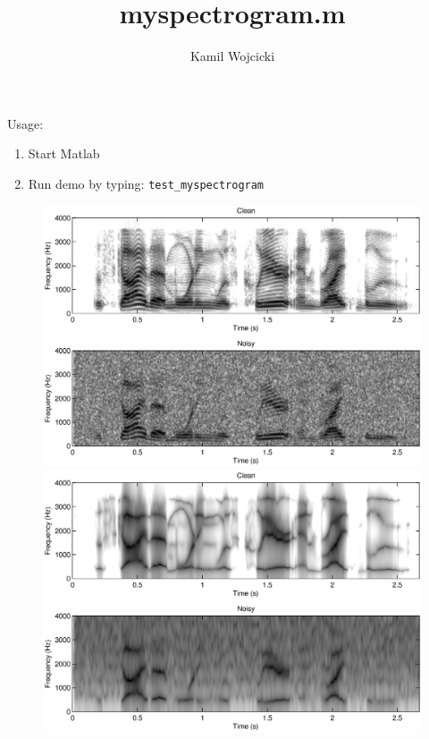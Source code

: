 \documentclass[a4paper,11pt,twoside,onecolumn]{article}
\title{myspectrogram.m}
\author{Kamil Wojcicki}
\begin{document}
\maketitle
\pagestyle{plain}

Usage:

\begin{enumerate}
\item Start Matlab
\item Run demo by typing: \texttt{test\_myspectrogram}
\end{enumerate}

\vspace{10mm}

\begin{figure}[ht!]
    \centering
    \includegraphics[width=0.7\linewidth]{test_myspectrogram.eps}
    \includegraphics[width=0.7\linewidth]{test_myspectrogram_lp.eps}
\end{figure}
\clearpage


{\tiny}

\clearpage
{\tiny}
\end{document}
